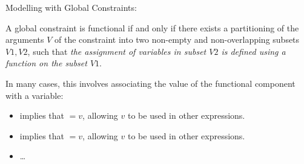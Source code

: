 \documentclass{cons-beamer}
\begin{document}
\begin{frame}{Modelling with Global Constraints:}
  \vfill

  \begin{definition}
    A global constraint  is functional if and only if there exists a partitioning of the arguments $V$ of the constraint into two non-empty and non-overlapping subsets $V1, V2$, such that \textit{the assignment of variables in subset $V2$ is defined using a function on the subset $V1$}.
  \end{definition}
  \vfill

  In many cases, this involves associating the value of the functional component with a variable:

  \begin{examples}
    \begin{itemize}
      \item {} implies that  $= v$, allowing $v$ to be used in other expressions.
      \item {} implies that  $= v$, allowing $v$ to be used in other expressions.
      \item \dots
    \end{itemize}
  \end{examples} 
\end{frame}
\end{document}
